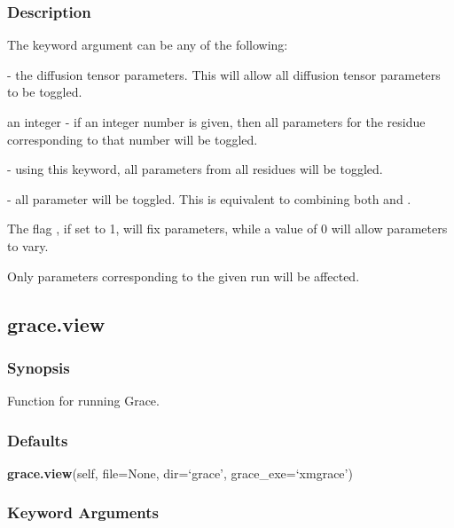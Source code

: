   

  
 \subsubsection{Description} 

 The keyword argument  can be any of the following: 
  

  - the diffusion tensor parameters.  This will allow all diffusion tensor parameters to be toggled. 
  

 an integer - if an integer number is given, then all parameters for the residue corresponding to that number will be toggled. 
  

  - using this keyword, all parameters from all residues will be toggled. 
  

  - all parameter will be toggled.  This is equivalent to combining both  and . 
  

 The flag , if set to 1, will fix parameters, while a value of 0 will allow parameters to vary. 
  

 Only parameters corresponding to the given run will be affected. 
  

  

 \newpage 

 \subsection{grace.view} 

  
 \subsubsection{Synopsis} 

 Function for running Grace. 
  

  
 \subsubsection{Defaults} 

 \textsf{\textbf{grace.view}(self, file=None, dir=`grace', grace\_exe=`xmgrace')} 

  
 \subsubsection{Keyword Arguments} 

